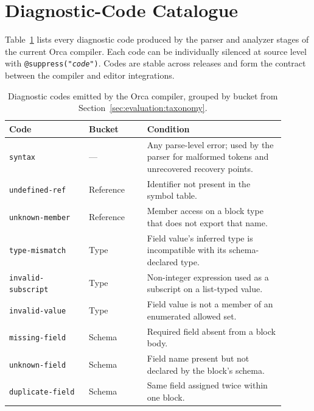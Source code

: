 \documentclass[sigconf,nonacm]{acmart}
\begin{document}
\appendix
\section{Diagnostic-Code Catalogue}
\label{sec:appendix:diagnostics}

Table~\ref{tab:diagnostics} lists every diagnostic code produced by the
parser and analyzer stages of the current Orca compiler. Each code can be
individually silenced at source level with
\texttt{@suppress("\textit{code}")}. Codes are stable across releases and
form the contract between the compiler and editor integrations.

\begin{table}[!ht]
  \centering
  \small
  \caption{Diagnostic codes emitted by the Orca compiler, grouped by
  bucket from Section~\ref{sec:evaluation:taxonomy}.}
  \label{tab:diagnostics}
  \begin{tabular}{@{}p{0.26\linewidth}p{0.19\linewidth}p{0.45\linewidth}@{}}
    \toprule
    \textbf{Code} & \textbf{Bucket} & \textbf{Condition} \\
    \midrule
    \texttt{syntax}            & ---           & Any parse-level error; used by the parser for malformed tokens and unrecovered recovery points. \\
    \midrule
    \texttt{undefined-ref}     & Reference     & Identifier not present in the symbol table. \\
    \texttt{unknown-member}    & Reference     & Member access on a block type that does not export that name. \\
    \midrule
    \texttt{type-mismatch}     & Type          & Field value's inferred type is incompatible with its schema-declared type. \\
    \texttt{invalid-subscript} & Type          & Non-integer expression used as a subscript on a list-typed value. \\
    \texttt{invalid-value}     & Type          & Field value is not a member of an enumerated allowed set. \\
    \midrule
    \texttt{missing-field}     & Schema        & Required field absent from a block body. \\
    \texttt{unknown-field}     & Schema        & Field name present but not declared by the block's schema. \\
    \texttt{duplicate-field}   & Schema        & Same field assigned twice within one block. \\

\end{tabular}
\end{table}
\end{document}
